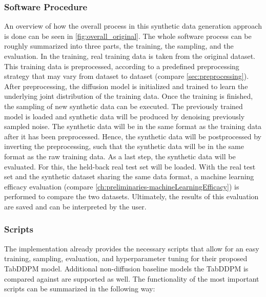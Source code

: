 \subsubsection[]{Software Procedure}
\label{ch:Software_Procedure}

An overview of how the overall process in this synthetic data generation approach is done can be seen in \autoref{fig:overall_original}.
The whole software process can be roughly summarized into three parts, the training, the sampling, and the evaluation.
In the training, real training data is taken from the original dataset.
This training data is preprocessed, according to a predefined preprocessing strategy that may vary from dataset to dataset (compare \autoref{sec:preprocessing}).
After preprocessing, the diffusion model is initialized and trained to learn the underlying joint distribution of the training data.
Once the training is finished, the sampling of new synthetic data can be executed.
The previously trained model is loaded and synthetic data will be produced by denoising previously sampled noise.
The synthetic data will be in the same format as the training data after it has been preprocessed.
Hence, the synthetic data will be postprocessed by inverting the preprocessing, such that the synthetic data will be in the same format as the raw training data.
As a last step, the synthetic data will be evaluated. 
For this, the held-back real test set will be loaded.
With the real test set and the synthetic dataset sharing the same data format, a machine learning efficacy evaluation (compare \autoref{ch:preliminaries-machineLearningEfficacy}) is performed to compare the two datasets.
Ultimately, the results of this evaluation are saved and can be interpreted by the user.

\subsubsection[]{Scripts}
\label{ch:scripts}

The implementation \cite{akim2023TabDDPMModellingTabular} already provides the necessary scripts that allow for an
easy training, sampling, evaluation, and hyperparameter tuning for their proposed TabDDPM model.
Additional non-diffusion baseline models the TabDDPM is compared against are supported as well.
The functionality of the most important scripts can be summarized in the following way:

